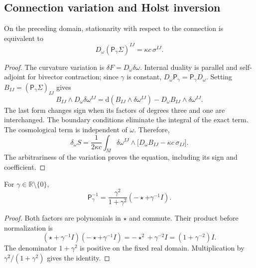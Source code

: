 \subsection{Connection variation and Holst inversion}
\label{vii:subsec:variacion-holst}

\begin{theorem}
\label{vii:thm:ecuacion-cartan-holst}
On the preceding domain, stationarity with respect to the connection
is equivalent to
\begin{equation}
 D_\omega(\mathsf P_\gamma\Sigma)^{IJ}
       =\kappa c\,\sigma^{IJ}.
 \label{vii:eq:ecuacion-cartan-holst}
\end{equation}
\end{theorem}
\begin{proof}
The curvature variation is
\(\delta F=D_\omega\delta\omega\). Internal duality is parallel
and self-adjoint for bivector contraction; since \(\gamma\) is
constant, \(D_\omega\mathsf P_\gamma=\mathsf P_\gamma D_\omega\).
Setting \(B_{IJ}=(\mathsf P_\gamma\Sigma)_{IJ}\) gives
\[
 B_{IJ}\wedge D_\omega\delta\omega^{IJ}
 =\mathrm d(B_{IJ}\wedge\delta\omega^{IJ})
   -D_\omega B_{IJ}\wedge\delta\omega^{IJ}.
\]
The last form changes sign when its factors of degrees three and one
are interchanged. The boundary conditions eliminate the integral of
the exact term. The cosmological term is independent of \(\omega\).
Therefore,
\[
 \delta_\omega S=
 \frac1{2\kappa c}\int_M\delta\omega^{IJ}\wedge
       \bigl[D_\omega B_{IJ}-\kappa c\,\sigma_{IJ}\bigr].
\]
The arbitrariness of the variation proves the equation, including its
sign and coefficient.
\end{proof}

\begin{lemma}
\label{vii:lem:inversa-holst}
For \(\gamma\in\mathbb R\setminus\{0\}\),
\begin{equation}
 \mathsf P_\gamma^{-1}
 =\frac{\gamma^2}{1+\gamma^2}
                      (-\star+\gamma^{-1}I).
 \label{vii:eq:inversa-holst}
\end{equation}
\end{lemma}
\begin{proof}
Both factors are polynomials in \(\star\) and commute. Their
product before normalization is
\[
 (\star+\gamma^{-1}I)(-\star+\gamma^{-1}I)
 =-\star^2+\gamma^{-2}I=(1+\gamma^{-2})I.
\]
The denominator \(1+\gamma^2\) is positive on the fixed real
domain. Multiplication by \(\gamma^2/(1+\gamma^2)\) gives the identity.
\end{proof}

